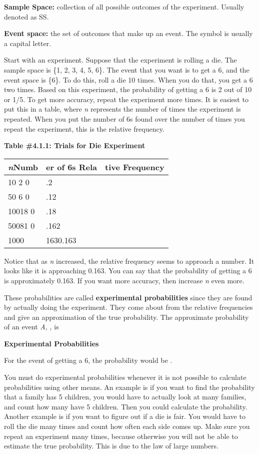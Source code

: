 \documentclass[]{book}
\begin{document}
\textbf{Sample Space:} collection of all possible outcomes of the experiment. Usually denoted as SS.

\textbf{Event space:} the set of outcomes that make up an event. The symbol is usually a capital letter.

Start with an experiment. Suppose that the experiment is rolling a die. The sample space is \{1, 2, 3, 4, 5, 6\}. The event that you want is to get a 6, and the event space is \{6\}. To do this, roll a die 10 times. When you do that, you get a 6 two times. Based on this experiment, the probability of getting a 6 is 2 out of 10 or 1/5. To get more accuracy, repeat the experiment more times. It is easiest to put this in a table, where \emph{n} represents the number of times the experiment is repeated. When you put the number of 6s found over the number of times you repeat the experiment, this is the relative frequency.

\textbf{Table \#4.1.1: Trials for Die Experiment}

\begin{longtable}[]{@{}lll@{}}
\toprule
\emph{n}Numb & er of 6s Rela & tive Frequency\tabularnewline
\midrule
\endhead
10 2 0 & .2 &\tabularnewline
50 6 0 & .12 &\tabularnewline
10018 0 & .18 &\tabularnewline
50081 0 & .162 &\tabularnewline
1000 & 1630.163 &\tabularnewline
\bottomrule
\end{longtable}

Notice that as \emph{n} increased, the relative frequency seems to approach a
number. It looks like it is approaching 0.163. You can say that the
probability of getting a 6 is approximately 0.163. If you want more
accuracy, then increase \emph{n} even more.

These probabilities are called \textbf{experimental probabilities} since they
are found by actually doing the experiment. They come about from the
relative frequencies and give an approximation of the true probability.
The approximate probability of an event \emph{A}, \emph{,} is

\textbf{Experimental Probabilities}

For the event of getting a 6, the probability would be .

You must do experimental probabilities whenever it is not possible to
calculate probabilities using other means. An example is if you want to
find the probability that a family has 5 children, you would have to
actually look at many families, and count how many have 5 children. Then
you could calculate the probability. Another example is if you want to
figure out if a die is fair. You would have to roll the die many times
and count how often each side comes up. Make sure you repeat an
experiment many times, because otherwise you will not be able to
estimate the true probability. This is due to the law of large numbers.
\end{document}
